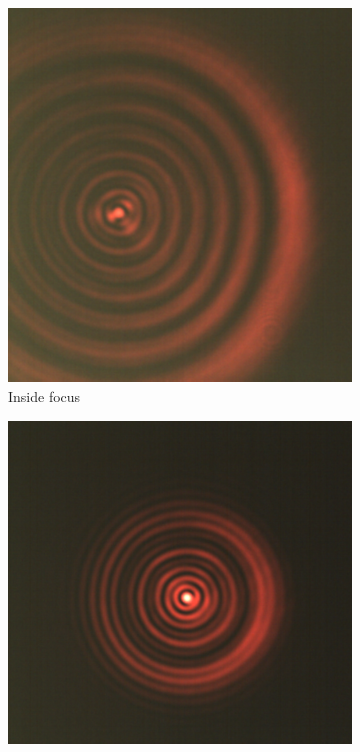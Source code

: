\documentclass[a4paper,12pt]{article}
\begin{document}
\begin{figure}[H]
        \centering
        \begin{subfigure}{0.3\textwidth}
                \includegraphics[width=\textwidth]{airyinsidefocus}
                \caption{Inside focus}
                \label{fig:sainside}
        \end{subfigure}
        \begin{subfigure}{0.3\textwidth}
                \includegraphics[width=\textwidth]{airyinfocus}

\end{subfigure}
\end{figure}
\end{document}
